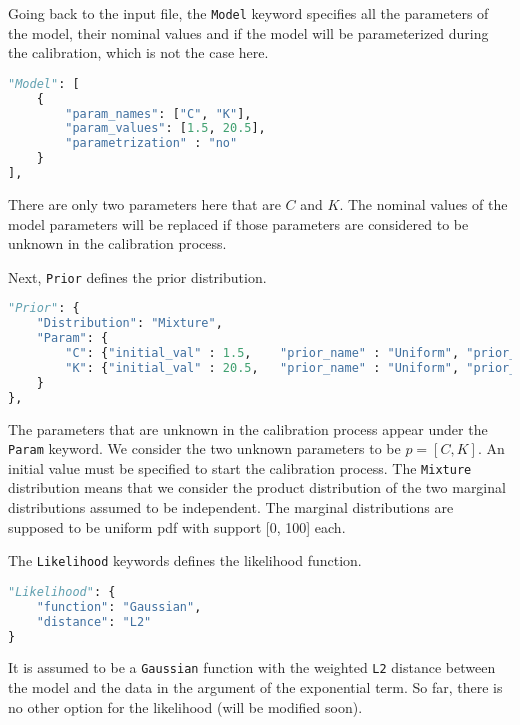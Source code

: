 \documentclass[a4paper,11pt]{article}
\begin{document}
Going back to the input file, the \texttt{Model} keyword specifies all the parameters of the model, their nominal values and if the model will be parameterized during the calibration, which is not the case here. 
\begin{lstlisting}[language=Python, breaklines=true, tabsize=4, backgroundcolor=\color{codegray}]
"Model": [ 
    {
        "param_names": ["C", "K"],
        "param_values": [1.5, 20.5],
        "parametrization" : "no"
    }
],
\end{lstlisting}
There are only two parameters here that are $C$ and $K$. The nominal values of the model parameters will be replaced if those parameters are considered to be unknown in the calibration process. 

Next, \texttt{Prior} defines the prior distribution. 
\begin{lstlisting}[language=Python, breaklines=true, tabsize=4, backgroundcolor=\color{codegray}]
"Prior": { 
    "Distribution": "Mixture", 
    "Param": {
        "C": {"initial_val" : 1.5,    "prior_name" : "Uniform", "prior_param" : [0.0, 100]},  
        "K": {"initial_val" : 20.5,   "prior_name" : "Uniform", "prior_param" : [0.0, 100]}
    }
},
\end{lstlisting}
The parameters that are unknown in the calibration process appear under the \texttt{Param} keyword. We consider the two unknown parameters to be $p = [C, K]$. An initial value must be specified to start the calibration process. The \texttt{Mixture} distribution means that we consider the product distribution of the two marginal distributions assumed to be independent. The marginal distributions are supposed to be uniform pdf with support [0, 100] each.

The \texttt{Likelihood} keywords defines the likelihood function. 
\begin{lstlisting}[language=Python, breaklines=true, tabsize=4, backgroundcolor=\color{codegray}]
"Likelihood": {
    "function": "Gaussian",
    "distance": "L2"
}
\end{lstlisting}
It is assumed to be a \texttt{Gaussian} function with the weighted \texttt{L2} distance between the model and the data in the argument of the exponential term. So far, there is no other option for the likelihood (will be modified soon).  
\end{document}
